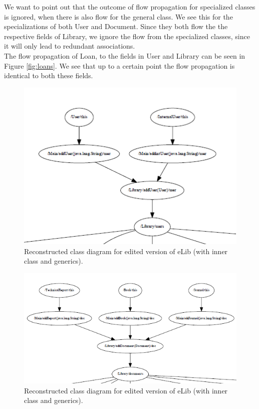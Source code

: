 \documentclass[a4paper,11pt]{article}
\begin{document}
			We want to point out that the outcome of flow propagation for specialized classes is ignored, when there is also flow for the general class. We see this for the specializations of both User and Document. Since they both flow the the respective fields of Library, we ignore the flow from the specialized classes, since it will only lead to redundant associations. \\

			The flow propagation of Loan, to the fields in User and Library can be seen in Figure \ref{fig:loans}. We see that up to a certain point the flow propagation is identical to both these fields. \\

			\begin{figure}[h!]
				\centering
				\includegraphics{users}
				\caption{Reconstructed class diagram for edited version of eLib (with inner class and generics).}
				\label{fig:users}
			\end{figure}

			\begin{figure}[h!]
				\centering
				\includegraphics{documents}
				\caption{Reconstructed class diagram for edited version of eLib (with inner class and generics).}
				\label{fig:docs}
			\end{figure}
\end{document}
